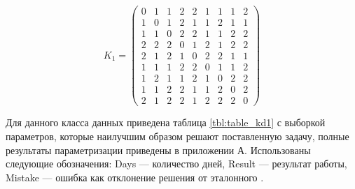 \begin{equation}
	\label{eq:kd1}
	K_{1} = \begin{pmatrix}
		0 & 1 & 1 & 2 & 2 & 1 & 1 & 1 & 2 \\ 
		1 & 0 & 1 & 2 & 1 & 1 & 2 & 1 & 1 \\ 
		1 & 1 & 0 & 2 & 2 & 1 & 1 & 2 & 2 \\ 
		2 & 2 & 2 & 0 & 1 & 2 & 1 & 2 & 2 \\ 
		2 & 1 & 2 & 1 & 0 & 2 & 2 & 1 & 1 \\ 
		1 & 1 & 1 & 2 & 2 & 0 & 1 & 1 & 2 \\ 
		1 & 2 & 1 & 1 & 2 & 1 & 0 & 2 & 2 \\ 
		1 & 1 & 2 & 2 & 1 & 1 & 2 & 0 & 2 \\ 
		2 & 1 & 2 & 2 & 1 & 2 & 2 & 2 & 0 
	\end{pmatrix}
\end{equation}

Для данного класса данных приведена таблица \ref{tbl:table_kd1}	с выборкой параметров, которые наилучшим образом решают поставленную задачу, полные результаты параметризации приведены в приложении А. Использованы следующие обозначения: Days --- количество дней, Result --- результат работы, Mistake --- ошибка как отклонение решения от эталонного .

